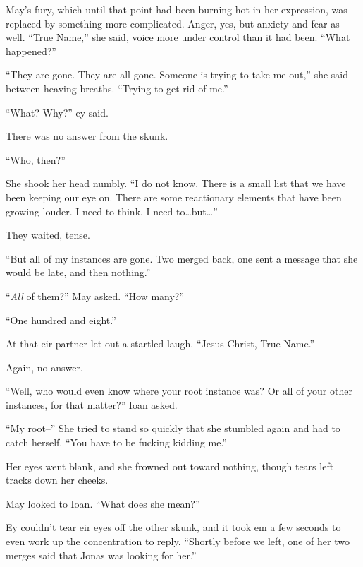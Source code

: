 May's fury, which until that point had been burning hot in her expression, was replaced by something more complicated. Anger, yes, but anxiety and fear as well. ``True Name,'' she said, voice more under control than it had been. ``What happened?''

``They are gone. They are all gone. Someone is trying to take me out,'' she said between heaving breaths. ``Trying to get rid of me.''

``What? Why?'' ey said.

There was no answer from the skunk.

``Who, then?''

She shook her head numbly. ``I do not know. There is a small list that we have been keeping our eye on. There are some reactionary elements that have been growing louder. I need to think. I need to\ldots but\ldots{}''

They waited, tense.

``But all of my instances are gone. Two merged back, one sent a message that she would be late, and then nothing.''

``\emph{All} of them?'' May asked. ``How many?''

``One hundred and eight.''

At that eir partner let out a startled laugh. ``Jesus Christ, True Name.''

Again, no answer.

``Well, who would even know where your root instance was? Or all of your other instances, for that matter?'' Ioan asked.

``My root--'' She tried to stand so quickly that she stumbled again and had to catch herself. ``You have to be fucking kidding me.''

Her eyes went blank, and she frowned out toward nothing, though tears left tracks down her cheeks.

May looked to Ioan. ``What does she mean?''

Ey couldn't tear eir eyes off the other skunk, and it took em a few seconds to even work up the concentration to reply. ``Shortly before we left, one of her two merges said that Jonas was looking for her.''
